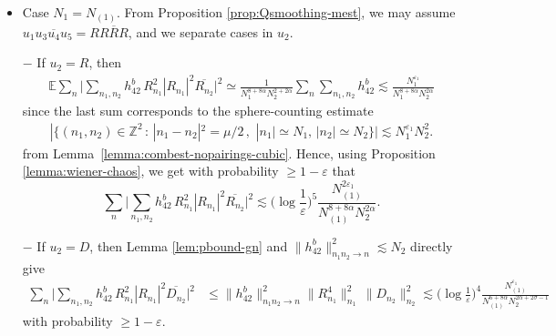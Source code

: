 \documentclass[11pt, xcolor = dvipsnames,reqno
]{amsart}
\theoremstyle{definition}
\theoremstyle{remark}
\begin{document}
    \begin{itemize}
        \item Case $N_1 = N_{(1)}$. From Proposition \ref{prop:Qsmoothing-mest}, we may assume $u_1 u_3 \overline{u_4}u_5 = RR\overline R R$, and we separate cases in $u_2$. 

        $-$ If $u_2 = R$, then  
        \begin{align}
            \mathbb E \sum_n \Bigg| \sum_{ n_1, n_2} h^b_{42} \, R_{n_1}^2 |R_{n_1}|^2 \overline{R_{n_2}} \Bigg|^2 
            \simeq \frac{1}{N_1^{8+8\alpha} N_2^{2+2\alpha}} \sum_n \sum_{n_1, n_2} h^b_{42} 
            \lesssim 
            \frac{N_1^{\varepsilon_1}}{N_1^{8+8\alpha} N_2^{2\alpha}} 
        \end{align}
        since the last sum corresponds to the sphere-counting estimate
        \begin{align}\label{eq:sphere-count-hb42}
           |\{ (n_1, n_2) \in \mathbb{Z}^2 \, : \, |n_1 - n_2|^2 = \mu/2 \, , \, \, |n_1| \simeq N_1, \, |n_2| \simeq N_2 \}| \lesssim N_1^{\varepsilon_1} N_2^2.
        \end{align} 
        from Lemma~\ref{lemma:combest-nopairings-cubic}. Hence, using Proposition \ref{lemma:wiener-chaos}, we get with probability $\geq 1-\varepsilon$ that 
        \begin{equation}\label{eq:Tensor42_R}
            \sum_n \Bigg| \sum_{ n_1, n_2} h^b_{42} \, R_{n_1}^2 |R_{n_1}|^2 \overline{R_{n_2}} \Bigg|^2
            \lesssim \Big( \log \frac{1}{\varepsilon} \Big)^5 \frac{N_{(1)}^{2\varepsilon_1}}{N_{(1)}^{8+8\alpha} N_2^{2\alpha}}.
        \end{equation}


        $-$ If $u_2 = D$, then Lemma \ref{lem:pbound-gn} and $\lVert h^b_{42} \rVert_{n_1n_2 \to n}^2 \lesssim N_2$ directly give
        \begin{align}\label{eq:Tensor42_D}
                \sum_n \Bigg| \sum_{ n_1, n_2} h^b_{42} \, R_{n_1}^2 |R_{n_1}|^2 \overline{D_{n_2}} \Bigg|^2
                & \leq \lVert h^b_{42} \rVert_{n_1n_2 \to n}^2 \lVert R_{n_1}^4 \rVert_{n_1}^2 \, 
                \lVert D_{n_2} \rVert_{n_2}^2
                \lesssim \Big( \log \frac{1}{\varepsilon} \Big)^4  \frac{N_{(1)}^{\varepsilon_1}}{N_{(1)}^{6+8\alpha} N_2^{2\alpha + 2\sigma - 1}}
        \end{align}
        with probability $\geq 1-\varepsilon$. 


\end{itemize}
\end{document}

